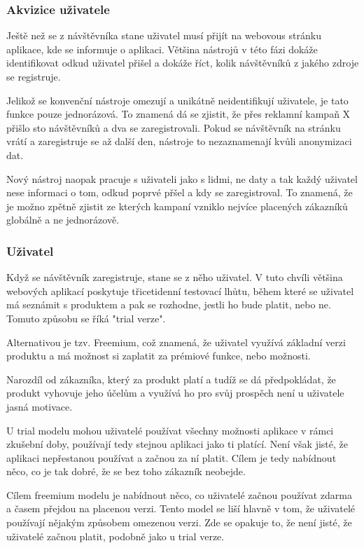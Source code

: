 \documentclass[bc,female,java,dept456]{diploma}						%
\begin{document}
\subsubsection{Akvizice uživatele}

Ještě než se z návštěvníka stane uživatel musí přijít na webovous stránku aplikace, kde se informuje o aplikaci. Většina nástrojů v této fázi dokáže identifikovat odkud uživatel přišel a dokáže říct, kolik návštěvníků z jakého zdroje se registruje.

Jelikož se konvenční nástroje omezují a unikátně neidentifikují uživatele, je tato funkce pouze jednorázová. To znamená dá se zjistit, že přes reklamní kampaň X přišlo sto návštěvníků a dva se zaregistrovali. Pokud se návštěvník na stránku vrátí a zaregistruje se až další den, nástroje to nezaznamenají kvůli anonymizaci dat.

Nový nástroj naopak pracuje s uživateli jako s lidmi, ne daty a tak každý uživatel nese informaci o tom, odkud poprvé přšel a kdy se zaregistroval. To znamená, že je možno zpětně zjistit ze kterých kampaní vzniklo nejvíce placených zákazníků globálně a ne jednorázově.

\subsubsection{Uživatel}

Když se návštěvník zaregistruje, stane se z něho uživatel. V tuto chvíli většina webových aplikací poskytuje třicetidenní testovací lhůtu, během které se uživatel má seznámit s produktem a pak se rozhodne, jestli ho bude platit, nebo ne. Tomuto způsobu se říká "trial verze".

Alternativou je tzv. Freemium, což znamená, že uživatel využívá základní verzi produktu a má možnost si zaplatit za prémiové funkce, nebo možnosti.

Narozdíl od zákazníka, který za produkt platí a tudíž se dá předpokládat, že produkt vyhovuje jeho účelům a využívá ho pro svůj prospěch není u uživatele jasná motivace. 

U trial modelu mohou uživatelé používat všechny možnosti aplikace v rámci zkušební doby, používají tedy stejnou aplikaci jako ti platící. Není však jisté, že aplikaci nepřestanou používat a začnou za ní platit. Cílem je tedy nabídnout něco, co je tak dobré, že se bez toho zákazník neobejde.

Cílem freemium modelu je nabídnout něco, co uživatelé začnou používat zdarma a časem přejdou na placenou verzi. Tento model se liší hlavně v tom, že uživatelé používají nějakým způsobem omezenou verzi. Zde se opakuje to, že není jisté, že uživatelé začnou platit, podobně jako u trial verze.
\end{document}
